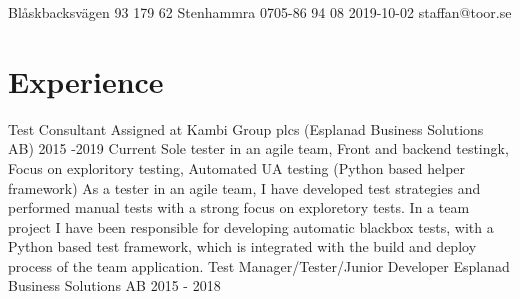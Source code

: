 \documentclass{sobCV}[2017/07/08]
\begin{document}
               {Blåskbacksvägen 93}
               {179 62 Stenhammra}
               {0705-86 94 08}
               {2019-10-02}
               {staffan@toor.se}


   \section{Experience}
      \experiencenode
      {Test Consultant}                %
      {Assigned at Kambi Group plcs (Esplanad Business Solutions AB)}%
      {2015 -2019}                        %
      {Current}{                           %
          Sole tester in an agile team,
          Front and backend testingk,
          Focus on exploritory testing,
          Automated UA testing (Python based helper framework)
      }{
          As a tester in an agile team, I have developed test strategies and 
          performed manual tests with a strong focus on exploretory tests. In a
          team project I have been responsible for developing automatic 
          blackbox tests, with a Python based test framework, which is 
          integrated with the build and deploy process of the team application.
      }
      \experiencenode
      {Test Manager/Tester/Junior Developer}         %
      {Esplanad Business Solutions AB}        %
      {2015 - 2018}                        %
\end{document}
